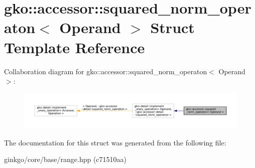 \hypertarget{structgko_1_1accessor_1_1squared__norm__operaton}{}\section{gko\+:\+:accessor\+:\+:squared\+\_\+norm\+\_\+operaton$<$ Operand $>$ Struct Template Reference}
\label{structgko_1_1accessor_1_1squared__norm__operaton}


Collaboration diagram for gko\+:\+:accessor\+:\+:squared\+\_\+norm\+\_\+operaton$<$ Operand $>$\+:
\nopagebreak
\begin{figure}[H]
\begin{center}
\leavevmode
\includegraphics[width=350pt]{structgko_1_1accessor_1_1squared__norm__operaton__coll__graph}
\end{center}
\end{figure}


The documentation for this struct was generated from the following file\+:\begin{DoxyCompactItemize}
\item 
ginkgo/core/base/range.\+hpp (c71510aa)\end{DoxyCompactItemize}
